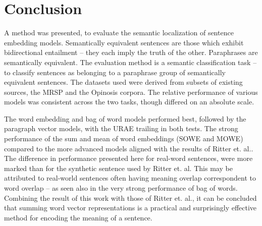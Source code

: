\documentclass[]{book}
\begin{document}
\section{Conclusion}

\label{sec:Conclusion}

A method was presented, to evaluate the semantic localization of sentence
embedding models. Semantically equivalent sentences are those which
exhibit bidirectional entailment -- they each imply the truth of the
other. Paraphrases are semantically equivalent. The evaluation method
is a semantic classification task -- to classify sentences as belonging
to a paraphrase group of semantically equivalent sentences. The datasets
used were derived from subsets of existing sources, the MRSP and the
Opinosis corpora. The relative performance of various models was consistent
across the two tasks, though differed on an absolute scale.

The word embedding and bag of word models performed best, followed
by the paragraph vector models, with the URAE trailing in both tests.
The strong performance of the sum and mean of word embeddings (SOWE
and MOWE) compared to the more advanced models aligned with the results
of Ritter et. al.\cite{RitterPosition}. The difference in performance
presented here for real-word sentences, were more marked than for
the synthetic sentence used by Ritter et. al. This may be attributed
to real-world sentences often having meaning overlap correspondent
to word overlap -- as seen also in the very strong performance of
bag of words. Combining the result of this work with those of Ritter
et. al., it can be concluded that summing word vector representations
is a practical and surprisingly effective method for encoding the
meaning of a sentence. 
\end{document}

